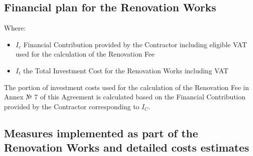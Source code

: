 \begin{center}
\end{center}

\subsection{Financial plan for the Renovation Works}


\begin{center}
\end{center}

Where:
\begin{itemize}
  \item $I_c$    Financial Contribution provided by the Contractor including eligible VAT used for the calculation of the Renovation Fee
  \item $I_t$    the Total Investment Cost for the Renovation Works including VAT
\end{itemize}

The portion of investment costs used for the calculation of the Renovation Fee in Annex № 7 of this Agreement is calculated based on the Financial Contribution provided by the Contractor corresponding to $I_C$.

\subsection{Measures implemented as part of the Renovation Works and detailed costs estimates}

